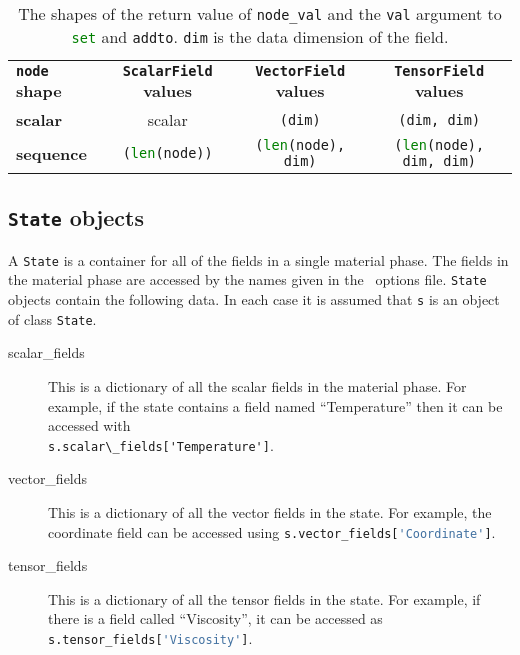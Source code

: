 \begin{table}
\centering

\begin{tabular}{lccc}
  \textbf{\lstinline[language=Python]+node+ shape}
  &\textbf{\lstinline[language=Python]+ScalarField+ values} & 
  \textbf{\lstinline[language=Python]+VectorField+ values} & 
  \textbf{\lstinline[language=Python]+TensorField+ values}\\
  \textbf{scalar} &
scalar& \lstinline[language=Python]+(dim)+ &\lstinline[language=Python]+(dim, dim)+ \\
  \textbf{sequence} &
\lstinline[language=Python]+(len(node))+&
\lstinline[language=Python]+(len(node), dim)+&
\lstinline[language=Python]+(len(node), dim, dim)+\\
\end{tabular}

\caption{The shapes of the return value of \lstinline[language=Python]+node_val+ and the
\lstinline[language=Python]+val+ argument to
\lstinline[language=Python]+set+ and
\lstinline[language=Python]+addto+. \lstinline[language=Python]+dim+ is the
data dimension of the field.
}
\end{table}

\subsection{\lstinline[language=Python]+State+ objects}

A \lstinline[language=Python]+State+ is a container for all of the fields in
a single material phase. The fields in the material phase are accessed by
the names given in the \fluidity\ options file.
\lstinline[language=Python]+State+ objects contain the following data. In
each case it is assumed that \lstinline[language=Python]+s+ is an object of
class \lstinline[language=Python]+State+.

\begin{description}
\item[scalar\_fields] This is a dictionary of all the scalar fields in the
  material phase. For example, if the state contains a field named
  ``Temperature'' then it can be accessed with\\
  \lstinline+s.scalar\_fields['Temperature']+.
\item[vector\_fields] This is a dictionary of all the vector fields in the
  state. For example, the coordinate field can be accessed using
  \lstinline[language=Python]+s.vector_fields['Coordinate']+.
\item[tensor\_fields] This is a dictionary of all the tensor fields in the
  state. For example, if there is a field called ``Viscosity'', it can be
  accessed as \lstinline[language=Python]+s.tensor_fields['Viscosity']+.
\end{description}

